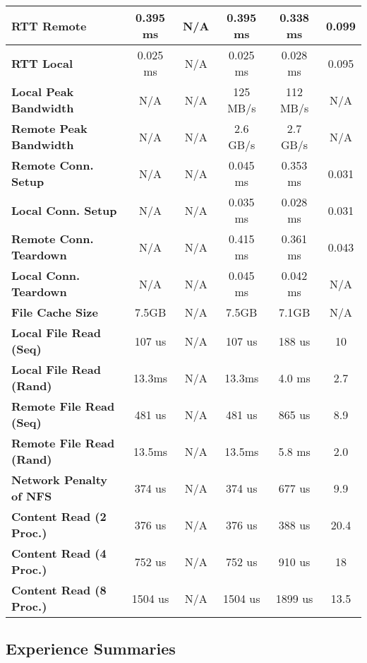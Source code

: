\begin{table}[ht]
\begin{threeparttable}
\begin{tabular}{lccccc}
  \hline
  \textbf{RTT Remote}  & 0.395 ms  & N/A & 0.395 ms & 0.338 ms & 0.099 \\
  \hline
  \textbf{RTT Local}  & 0.025 ms & N/A & 0.025 ms & 0.028 ms & 0.095 \\
  \hline
  \textbf{Local Peak Bandwidth}  & N/A & N/A & 125 MB/s & 112 MB/s & N/A\\
  \hline
  \textbf{Remote Peak Bandwidth} & N/A & N/A & 2.6 GB/s & 2.7 GB/s & N/A \\
  \hline
  \textbf{Remote Conn. Setup}  & N/A & N/A & 0.045 ms & 0.353 ms & 0.031 \\
  \hline
  \textbf{Local Conn. Setup}  & N/A & N/A & 0.035 ms & 0.028 ms & 0.031 \\
  \hline
  \textbf{Remote Conn. Teardown}  & N/A & N/A & 0.415 ms & 0.361 ms & 0.043 \\
  \hline
  \textbf{Local Conn. Teardown}  & N/A & N/A & 0.045 ms & 0.042 ms & N/A \\
  \hline
  \textbf{File Cache Size} & 7.5GB & N/A & 7.5GB & 7.1GB & N/A \\
  \hline
  \textbf{Local File Read (Seq)} & 107 us & N/A & 107 us & 188 us & 10 \\
  \hline
  \textbf{Local File Read (Rand)} & 13.3ms & N/A & 13.3ms & 4.0 ms & 2.7\\
  \hline
  \textbf{Remote File Read (Seq)} & 481 us & N/A & 481 us & 865 us & 8.9 \\
  \hline
  \textbf{Remote File Read (Rand)} & 13.5ms & N/A & 13.5ms & 5.8 ms & 2.0\\
  \hline
  \textbf{Network Penalty of NFS} & 374 us & N/A & 374 us & 677 us & 9.9 \\
  \hline
  \textbf{Content Read (2 Proc.)} & 376 us & N/A & 376 us & 388 us & 20.4 \\
  \hline
  \textbf{Content Read (4 Proc.)} & 752 us & N/A & 752 us & 910 us & 18 \\
  \hline
  \textbf{Content Read (8 Proc.)} & 1504 us & N/A & 1504 us & 1899 us & 13.5\\

  \hline
  \end{tabular}
  \end{threeparttable}
  \label{Summary_Table}
\end{table}

\subsection{Experience Summaries}

